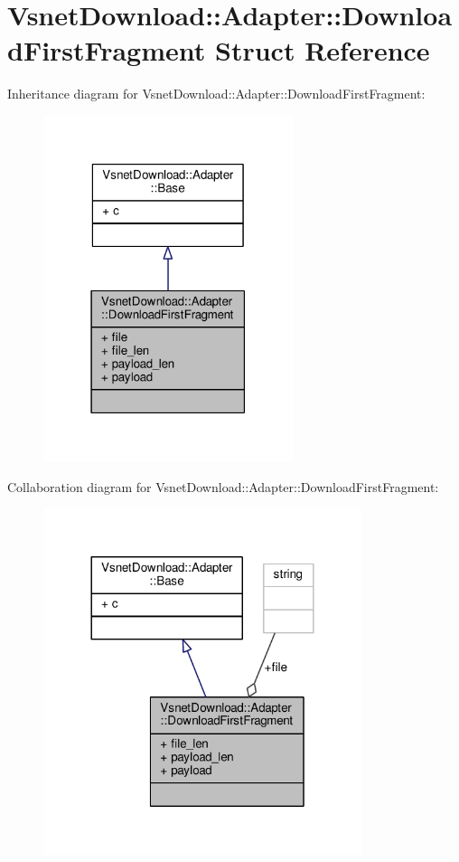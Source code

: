 \hypertarget{structVsnetDownload_1_1Adapter_1_1DownloadFirstFragment}{}\section{Vsnet\+Download\+:\+:Adapter\+:\+:Download\+First\+Fragment Struct Reference}
\label{structVsnetDownload_1_1Adapter_1_1DownloadFirstFragment}


Inheritance diagram for Vsnet\+Download\+:\+:Adapter\+:\+:Download\+First\+Fragment\+:
\nopagebreak
\begin{figure}[H]
\begin{center}
\leavevmode
\includegraphics[width=207pt]{d5/de1/structVsnetDownload_1_1Adapter_1_1DownloadFirstFragment__inherit__graph}
\end{center}
\end{figure}


Collaboration diagram for Vsnet\+Download\+:\+:Adapter\+:\+:Download\+First\+Fragment\+:
\nopagebreak
\begin{figure}[H]
\begin{center}
\leavevmode
\includegraphics[width=264pt]{d4/da5/structVsnetDownload_1_1Adapter_1_1DownloadFirstFragment__coll__graph}
\end{center}
\end{figure}
